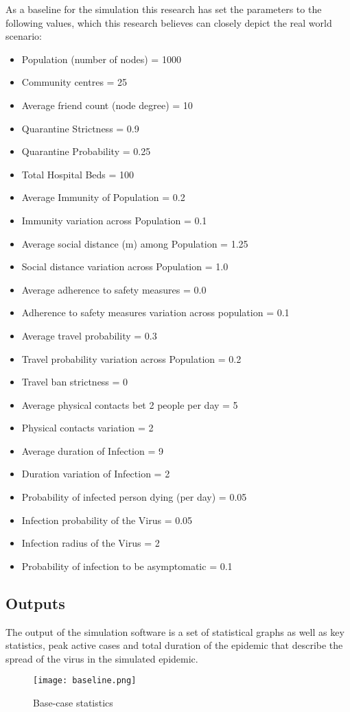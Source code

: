 \documentclass[conference]{IEEEtran}
\begin{document}
        As a baseline for the simulation this research has set the parameters to the following values, which this research believes can closely depict the real world scenario:
        \begin{itemize}
            \item Population (number of nodes) = 1000
            \item Community centres = 25
            \item Average friend count (node degree) = 10
            \item Quarantine Strictness = 0.9
            \item Quarantine Probability = 0.25
            \item Total Hospital Beds = 100
            \item Average Immunity of Population = 0.2
            \item Immunity variation across Population = 0.1
            \item Average social distance (m) among Population = 1.25
            \item Social distance variation across Population = 1.0 
            \item Average adherence to safety measures = 0.0
            \item Adherence to safety measures variation across population = 0.1
            \item Average travel probability = 0.3
            \item Travel probability variation across Population = 0.2
            \item Travel ban strictness = 0
            \item Average physical contacts bet 2 people per day = 5
            \item Physical contacts variation = 2
            \item Average duration of Infection = 9
            \item Duration variation of Infection = 2
            \item Probability of infected person dying (per day) = 0.05
            \item Infection probability of the Virus = 0.05
            \item Infection radius of the Virus = 2
            \item Probability of infection to be asymptomatic = 0.1\\
        \end{itemize}
        \subsection{Outputs}
            The output of the simulation software is a set of statistical graphs as well as key statistics, peak active cases and total duration of the epidemic that describe the spread of the virus in the simulated epidemic.
            \begin{figure}[!h]
        		\texttt{[image: baseline.png]}
        		\caption{Base-case statistics}
            \end{figure}
\end{document}
